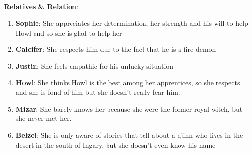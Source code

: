 



\\
\textbf{Relatives \& Relation}:
\begin{enumerate}
\item \textbf{Sophie}: She appreciates her determination, her strength and his will to help Howl and so she is glad to help her
\item \textbf{Calcifer}: She respects him due to the fact that he is a fire demon
\item \textbf{Justin}: She feels empathic for his unlucky situation
\item \textbf{Howl}: She thinks Howl is the best among her apprentices, so she respects and she is fond of him but she doesn't really  fear him.
\item \textbf{Mizar}: She barely knows her because she were the former royal witch, but she never met her.
\item \textbf{Belzel}: She is only aware of stories that tell about a djinn who lives in the desert in the south of Ingary, but she doesn't even know his name
\end{enumerate}

